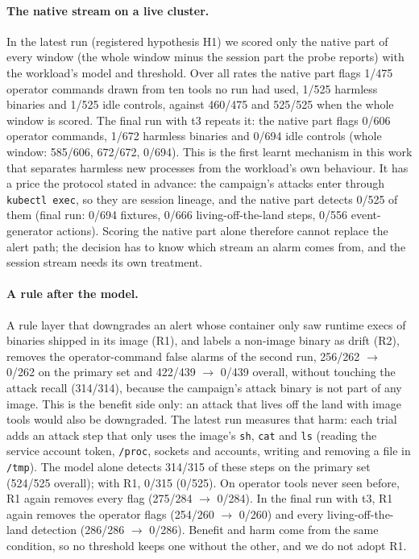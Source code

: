 \paragraph{The native stream on a live cluster.} In the latest run (registered hypothesis H1) we scored only the native
part of every window (the whole window minus the session part the probe reports) with the workload's model and
threshold. Over all rates the native part flags 1/475 operator commands drawn from ten tools no run had used, 1/525
harmless binaries and 1/525 idle controls, against 460/475 and 525/525 when the whole window is scored. The final run with t3
repeats it: the native part flags 0/606 operator commands, 1/672 harmless binaries and 0/694 idle controls (whole
window: 585/606, 672/672, 0/694). This is the
first learnt mechanism in this work that separates harmless new processes from the workload's own behaviour. It has a
price the protocol stated in advance: the campaign's attacks enter through \texttt{kubectl exec}, so they are session
lineage, and the native part detects 0/525 of them (final run: 0/694 fixtures, 0/666 living-off-the-land steps, 0/556
event-generator actions). Scoring the native part alone therefore cannot replace the alert
path; the decision has to know which stream an alarm comes from, and the session stream needs its own treatment.

\paragraph{A rule after the model.} A rule layer that downgrades an alert whose container only saw runtime execs of
binaries shipped in its image (R1), and labels a non-image binary as drift (R2), removes the operator-command false
alarms of the second run, 256/262 $\to$ 0/262 on the primary set and 422/439 $\to$ 0/439 overall, without touching the
attack recall (314/314), because the campaign's attack binary is not part of any image. This is the benefit side only:
an attack that lives off the land with image tools would also be downgraded. The latest run measures that harm: each
trial adds an attack step that only uses the image's \texttt{sh}, \texttt{cat} and \texttt{ls} (reading the service
account token, \texttt{/proc}, sockets and accounts, writing and removing a file in \texttt{/tmp}). The model alone
detects 314/315 of these steps on the primary set (524/525 overall); with R1, 0/315 (0/525). On operator tools never
seen before, R1 again removes every flag (275/284 $\to$ 0/284). In the final run with t3, R1 again removes the operator flags (254/260 $\to$ 0/260) and every
living-off-the-land detection (286/286 $\to$ 0/286). Benefit and harm come from the same condition, so no
threshold keeps one without the other, and we do not adopt R1.

